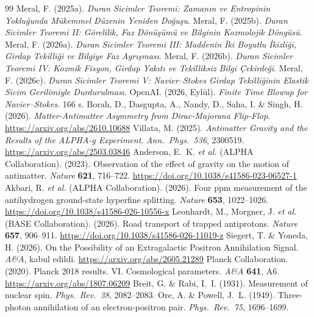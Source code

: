 \documentclass[12pt,a4paper]{article}
\begin{document}
\begin{thebibliography}{99}
     Meral, F. (2025a). \textit{Duran Sicimler Teoremi: Zamanın ve Entropinin Yokluğunda Mükemmel Düzenin Yeniden Doğuşu}.
     Meral, F. (2025b). \textit{Duran Sicimler Teoremi II: Görelilik, Faz Dönüşümü ve Bilginin Kozmolojik Döngüsü}.
     Meral, F. (2026a). \textit{Duran Sicimler Teoremi III: Maddenin İki Boyutlu İkizliği, Girdap Tekilliği ve Bilgiye Faz Ayrışması}.
     Meral, F. (2026b). \textit{Duran Sicimler Teoremi IV: Kozmik Fisyon, Girdap Yakıtı ve Tekilliksiz Bilgi Çekirdeği}.
     Meral, F. (2026c). \textit{Duran Sicimler Teoremi V: Navier--Stokes Girdap Tekilliğinin Elastik Sicim Gerilimiyle Durdurulması}.
     OpenAI. (2026, Eylül). \textit{Finite Time Blowup for Navier--Stokes}. 166 s.
     Borah, D., Dasgupta, A., Nandy, D., Saha, I. \& Singh, H. (2026). \textit{Matter-Antimatter Asymmetry from Dirac-Majorana Flip-Flop}. \url{https://arxiv.org/abs/2610.10688}
     Villata, M. (2025). \textit{Antimatter Gravity and the Results of the ALPHA-g Experiment}. \textit{Ann.\ Phys.\ 536}, 2300519. \url{https://arxiv.org/abs/2503.03846}
     Anderson, E.~K. \textit{et al.} (ALPHA Collaboration). (2023). Observation of the effect of gravity on the motion of antimatter. \textit{Nature} \textbf{621}, 716--722. \url{https://doi.org/10.1038/s41586-023-06527-1}
     Akbari, R. \textit{et al.} (ALPHA Collaboration). (2026). Four ppm measurement of the antihydrogen ground-state hyperfine splitting. \textit{Nature} \textbf{653}, 1022--1026. \url{https://doi.org/10.1038/s41586-026-10556-x}
     Leonhardt, M., Morgner, J. \textit{et al.} (BASE Collaboration). (2026). Road transport of trapped antiprotons. \textit{Nature} \textbf{657}, 906--911. \url{https://doi.org/10.1038/s41586-026-11019-z}
     Siegert, T. \& Yoneda, H. (2026). On the Possibility of an Extragalactic Positron Annihilation Signal. \textit{A\&A}, kabul edildi. \url{https://arxiv.org/abs/2605.21289}
     Planck Collaboration. (2020). Planck 2018 results. VI. Cosmological parameters. \textit{A\&A} \textbf{641}, A6. \url{https://arxiv.org/abs/1807.06209}
     Breit, G. \& Rabi, I.~I. (1931). Measurement of nuclear spin. \textit{Phys.\ Rev.\ 38}, 2082--2083.
     Ore, A. \& Powell, J.~L. (1949). Three-photon annihilation of an electron-positron pair. \textit{Phys.\ Rev.\ 75}, 1696--1699.
\end{thebibliography}
\end{document}
